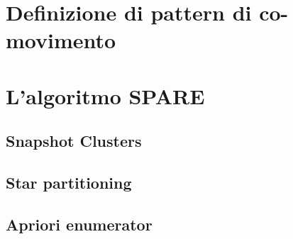 
\section{Definizione di pattern di co-movimento}\label{sec:comovement-definition}


\section{L'algoritmo SPARE}\label{sec:gcmp}


\subsection{Snapshot Clusters}\label{subsec:gcmp-clustering}


\subsection{Star partitioning}\label{subsec:gcmp-star-partitioning}


\subsection{Apriori enumerator}\label{subsec:gcmp-apriori}


